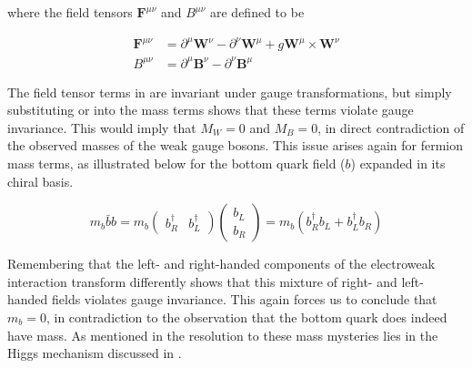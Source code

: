 where the field tensors $\boldsymbol{F}^{\mu\nu}$ and $B^{\mu\nu}$ are defined
to be

\begin{align}
\boldsymbol{F}^{\mu\nu}  &= \partial^{\mu}\boldsymbol{W}^{\nu} -
\partial^{\nu}\boldsymbol{W}^{\mu} + g\boldsymbol{W}^{\mu} \times
\boldsymbol{W}^{\nu} \\
B^{\mu\nu} &=  \partial^{\mu}\boldsymbol{B}^{\nu} -
\partial^{\nu}\boldsymbol{B}^{\mu}
\end{align}

The field tensor terms in  are invariant under
gauge transformations, but simply substituting  or
 into the mass terms shows that these terms violate gauge
invariance. This would imply that $M_{W} = 0$ and $M_{B} = 0$, in direct
contradiction of the observed masses of the weak gauge bosons.  This issue
arises again for fermion mass terms, as illustrated below for the bottom quark field
($b$) expanded in its chiral basis.

\begin{equation}
m_{b}\bar{b}b = m_{b} \left( \begin{matrix}b^{\dagger}_{R} &
b^{\dagger}_{L} \end{matrix} \right) \left( \begin{matrix} b_{L}
\\ b_{R} \end{matrix} \right) = m_{b}(b^{\dagger}_{R}b_{L} +
b^{\dagger}_{L}b_{R})
\end{equation}

Remembering that the left- and right-handed components of the electroweak
interaction transform differently shows that this mixture of right- and left-
handed fields violates gauge invariance. This again forces us to conclude that
$m_{b} = 0$, in contradiction to the observation that the bottom quark does indeed
have mass. As mentioned in  the resolution to these
mass mysteries lies in the Higgs mechanism discussed in .
